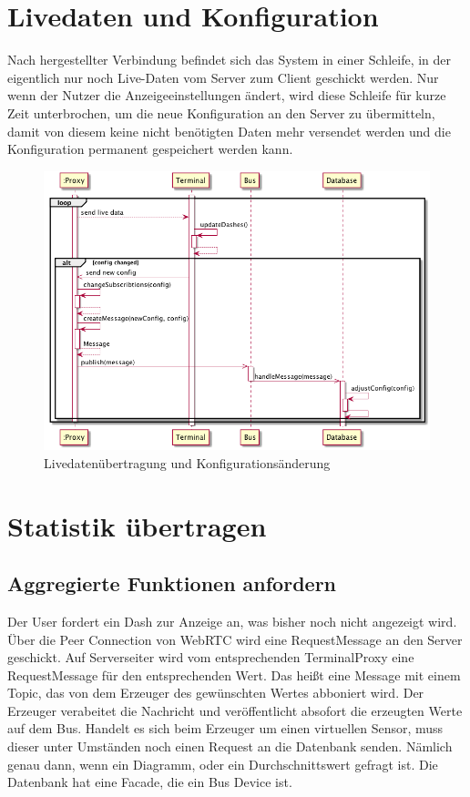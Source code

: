 \documentclass[entwurf.tex]{subfiles}
\begin{document}
  	\section{Livedaten und Konfiguration}
  	\label{Sequence:LiveDataNewConfig}
  		Nach hergestellter Verbindung befindet sich das System in einer Schleife, in der eigentlich nur noch Live-Daten vom Server zum Client geschickt werden. Nur wenn der Nutzer die Anzeigeeinstellungen ändert, wird diese Schleife für kurze Zeit unterbrochen, um die neue Konfiguration an den Server zu übermitteln, damit von diesem keine nicht benötigten Daten mehr versendet werden und die Konfiguration permanent gespeichert werden kann.
  		\begin{figure}[H]
  			\begin{center}
 				\includegraphics[width=\textwidth]{diagrams/ChangeDashConfig.png}
  				\caption{Livedatenübertragung und Konfigurationsänderung}
  			\end{center}
  		\end{figure}
  		
  	\section{Statistik übertragen}
  		\subsection{Aggregierte Funktionen anfordern}

      Der User fordert ein Dash zur Anzeige an, was bisher noch nicht angezeigt wird. Über die Peer Connection von WebRTC wird eine \elqq RequestMessage\erqq{} an den Server geschickt. Auf Serverseiter wird vom entsprechenden TerminalProxy eine RequestMessage für den entsprechenden Wert. Das heißt eine Message mit einem Topic, das von dem Erzeuger des gewünschten Wertes abboniert wird. Der Erzeuger verabeitet die Nachricht und veröffentlicht absofort die erzeugten Werte auf dem Bus. Handelt es sich beim Erzeuger um einen virtuellen Sensor, muss dieser unter Umständen noch einen Request an die Datenbank senden. Nämlich genau dann, wenn ein Diagramm, oder ein Durchschnittswert gefragt ist. Die Datenbank hat eine Facade, die ein Bus Device ist.
\end{document}
